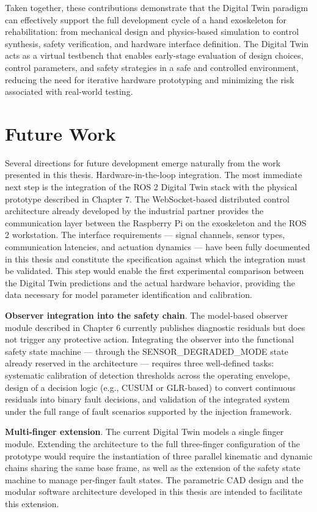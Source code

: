 Taken together, these contributions demonstrate that the Digital Twin paradigm can effectively support the full development cycle of a hand exoskeleton for rehabilitation: from mechanical design and physics-based simulation to control synthesis, safety verification, and hardware interface definition. The Digital Twin acts as a virtual testbench that enables early-stage evaluation of design choices, control parameters, and safety strategies in a safe and controlled environment, reducing the need for iterative hardware prototyping and minimizing the risk associated with real-world testing.

\section{Future Work}
Several directions for future development emerge naturally from the work presented in this thesis.
Hardware-in-the-loop integration. The most immediate next step is the integration of the ROS 2 Digital Twin stack with the physical prototype described in Chapter 7. The WebSocket-based distributed control architecture already developed by the industrial partner provides the communication layer between the Raspberry Pi on the exoskeleton and the ROS 2 workstation. The interface requirements — signal channels, sensor types, communication latencies, and actuation dynamics — have been fully documented in this thesis and constitute the specification against which the integration must be validated. This step would enable the first experimental comparison between the Digital Twin predictions and the actual hardware behavior, providing the data necessary for model parameter identification and calibration.

\textbf{Observer integration into the safety chain}. The model-based observer module described in Chapter 6 currently publishes diagnostic residuals but does not trigger any protective action. Integrating the observer into the functional safety state machine — through the SENSOR\_DEGRADED\_MODE state already reserved in the architecture — requires three well-defined tasks: systematic calibration of detection thresholds across the operating envelope, design of a decision logic (e.g., CUSUM or GLR-based) to convert continuous residuals into binary fault decisions, and validation of the integrated system under the full range of fault scenarios supported by the injection framework.

\textbf{Multi-finger extension}. The current Digital Twin models a single finger module. Extending the architecture to the full three-finger configuration of the prototype would require the instantiation of three parallel kinematic and dynamic chains sharing the same base frame, as well as the extension of the safety state machine to manage per-finger fault states. The parametric CAD design and the modular software architecture developed in this thesis are intended to facilitate this extension.

